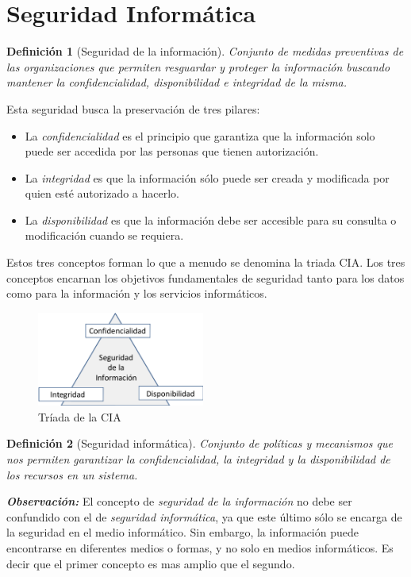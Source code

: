 \documentclass[peerreview]{IEEEtran}
\newtheorem{defin}{\textbf{Definición}}
\begin{document}

\section{Seguridad Informática}
\begin{defin}[Seguridad de la información]
  Conjunto de medidas preventivas de las organizaciones  que permiten resguardar
  y proteger la información buscando mantener la confidencialidad, disponibilidad
  e integridad de la misma.
\end{defin}
\bigbreak
Esta seguridad busca la preservación de tres pilares:
\begin{itemize}
  \item La \textit{confidencialidad} es el principio que garantiza que la
        información solo puede ser accedida por las personas que tienen autorización.
  \item La \textit{integridad} es que la información sólo puede ser creada y
        modificada por quien esté autorizado a hacerlo.
  \item La \textit{disponibilidad} es que la información debe ser accesible
        para su consulta o modificación cuando se requiera.
\end{itemize}
\bigbreak
Estos tres conceptos forman lo que a menudo se denomina la triada CIA. Los tres
conceptos encarnan los objetivos fundamentales de seguridad tanto para los
datos como para la información y los servicios informáticos.
\begin{figure}[htbp]
  \centering
  \includegraphics[width=5.5cm]{figuras/cia_tirada.png}
  \caption{Tríada de la CIA}
  \label{fig: 1}
\end{figure}
\bigbreak
\begin{defin}[Seguridad informática]
  Conjunto de políticas y mecanismos que nos permiten garantizar la
  confidencialidad, la integridad y la disponibilidad de los recursos en un
  sistema.
\end{defin}
\bigbreak
\textbf{\textit{Observación:}} El concepto de \textit{seguridad de la
  información} no debe ser confundido con el de \textit{seguridad informática},
ya que este último sólo se encarga de la seguridad en el medio informático. Sin
embargo, la información puede encontrarse en diferentes medios o formas, y no
solo en medios informáticos. Es decir que el primer concepto es mas amplio que
el segundo.
\end{document}
